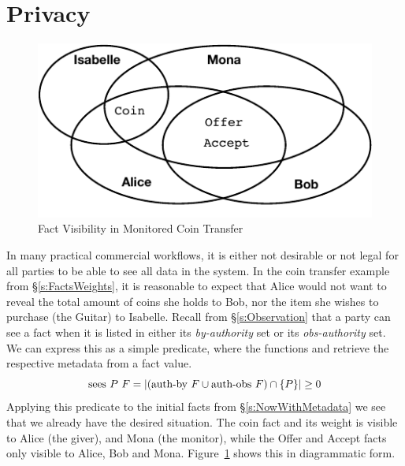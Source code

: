 
\section{Privacy}
\label{s:Privacy}

\begin{figure}
\begin{center}
\includegraphics{figure/coin-transfer-visibility.pdf}
\end{center}
\vspace{-2ex}
\caption{Fact Visibility in Monitored Coin Transfer}
\label{f:CoinTransferVisibility}
\end{figure}

In many practical commercial workflows, it is either not desirable or not legal for all parties to be able to see all data in the system. In the coin transfer example from \S\ref{s:FactsWeights}, it is reasonable to expect that Alice would not want to reveal the total amount of coins she holds to Bob, nor the item she wishes to purchase (the Guitar) to Isabelle. Recall from \S\ref{s:Observation} that a party can see a fact when it is listed in either its \emph{by-authority} set or its \emph{obs-authority} set. We can express this as a simple predicate, where the functions  and  retrieve the respective metadata from a fact value.
$$
\textrm{sees}~ P~ F = |(\textrm{auth-by}~F \cup \textrm{auth-obs}~F) \cap \{P\}| \ge 0
$$
Applying this predicate to the initial facts from \S\ref{s:NowWithMetadata} we see that we already have the desired situation. The coin fact and its weight is visible to Alice (the giver), and Mona (the monitor), while the Offer and Accept facts only visible to Alice, Bob and Mona. Figure~\ref{f:CoinTransferVisibility} shows this in diagrammatic form.




